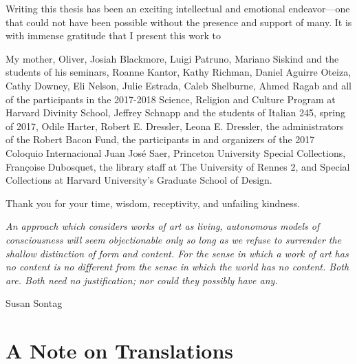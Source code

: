 \documentclass[11pt]{report}
\makeatletter
\renewenvironment{quotation}{\list{}{\listparindent = 25pt  \parsep\z@ \@plus\p@} \item\relax}{\endlist}
\makeatother
\begin{document}
\begin{singlespacing}

\noindent Writing this thesis has been an exciting intellectual and emotional endeavor---one that could not have been possible without the presence and support of many. It is with immense gratitude that I present this work to

\begin{quotation}

My mother, Oliver, Josiah Blackmore, Luigi Patruno, Mariano Siskind and the students of his seminars, Roanne Kantor, Kathy Richman, Daniel Aguirre Oteiza, Cathy Downey, Eli Nelson, Julie Estrada, Caleb Shelburne, Ahmed Ragab and all of the participants in the 2017-2018 Science, Religion and Culture Program at Harvard Divinity School, Jeffrey Schnapp and the students of Italian 245, spring of 2017, Odile Harter, Robert E. Dressler, Leona E. Dressler, the administrators of the Robert Bacon Fund, the participants in and organizers of the 2017 Coloquio Internacional Juan José Saer, Princeton University Special Collections, Françoise Dubosquet, the library staff at The University of Rennes 2, and Special Collections at Harvard University's Graduate School of Design.

\end{quotation}
Thank you for your time, wisdom, receptivity, and unfailing kindness.

\end{singlespacing}

\newpage

\thispagestyle{plain}

\epigraph{\vspace{450pt} \singlespacing \raggedleft \textit{An approach which considers works of art as living, autonomous models of consciousness will seem objectionable only so long as we refuse to surrender the shallow distinction of form and content. For the sense in which a work of art has no content is no different from the sense in which the world has no content. Both are. Both need no justification; nor could they possibly have any.}}{\vspace{15pt} Susan Sontag}

\tableofcontents

\newpage


\chapter*{A Note on Translations}
\end{document}
